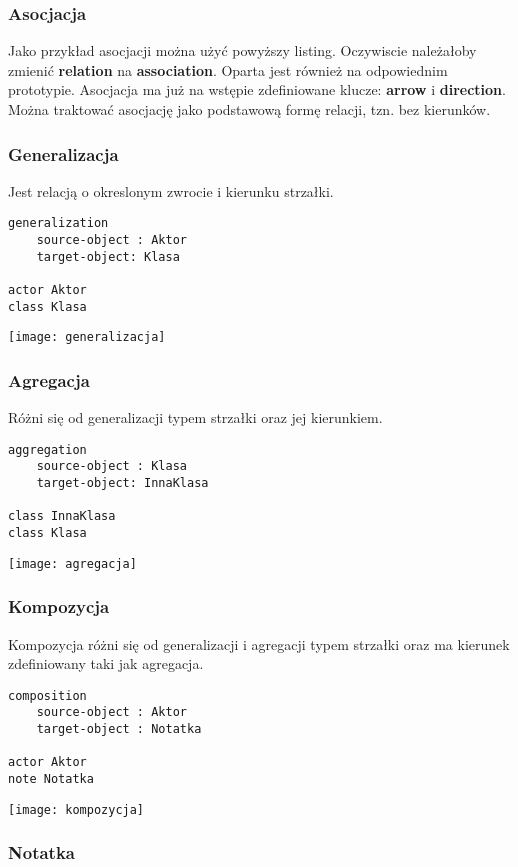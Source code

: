 \subsubsection{Asocjacja}

Jako przykład asocjacji można użyć powyższy listing. Oczywiscie należałoby zmienić \textbf{relation} na \textbf{association}. Oparta jest również na odpowiednim prototypie. Asocjacja ma już na wstępie zdefiniowane klucze: \textbf{arrow} i \textbf{direction}. Można traktować asocjację jako podstawową formę relacji, tzn. bez kierunków.

\subsubsection{Generalizacja}

Jest relacją o okreslonym zwrocie i kierunku strzałki.
\begin{lstlisting}
generalization
    source-object : Aktor
    target-object: Klasa

actor Aktor
class Klasa
\end{lstlisting}
\texttt{[image: generalizacja]}

\subsubsection{Agregacja}

Różni się od generalizacji typem strzałki oraz jej kierunkiem.
\begin{lstlisting}
aggregation
    source-object : Klasa
    target-object: InnaKlasa

class InnaKlasa
class Klasa
\end{lstlisting}
\texttt{[image: agregacja]}

\subsubsection{Kompozycja}

Kompozycja różni się od generalizacji i agregacji typem strzałki oraz ma kierunek zdefiniowany taki jak agregacja.
\begin{lstlisting}
composition 
    source-object : Aktor
    target-object : Notatka
    
actor Aktor
note Notatka
\end{lstlisting}
\texttt{[image: kompozycja]}

\subsubsection{Notatka}

